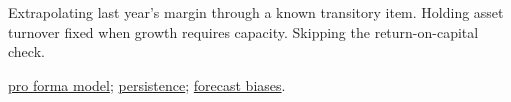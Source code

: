 \begin{qfmethod}
 Extrapolating last year's margin through a known transitory item. Holding asset turnover fixed when growth requires capacity. Skipping the return-on-capital check.

 \hyperref[ex:harbour-pro-forma-model]{pro forma model}; \hyperref[meth:earnings-quality-persistence]{persistence}; \hyperref[meth:forecast-biases-remedies]{forecast biases}.

\end{qfmethod}
